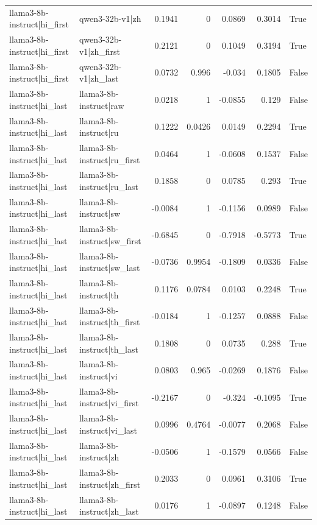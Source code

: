 \begin{table}
\begin{tabular}{l l r r r r l}
llama3-8b-instruct|hi_first & qwen3-32b-v1|zh & 0.1941 & 0 & 0.0869 & 0.3014 & True \\
llama3-8b-instruct|hi_first & qwen3-32b-v1|zh_first & 0.2121 & 0 & 0.1049 & 0.3194 & True \\
llama3-8b-instruct|hi_first & qwen3-32b-v1|zh_last & 0.0732 & 0.996 & -0.034 & 0.1805 & False \\
llama3-8b-instruct|hi_last & llama3-8b-instruct|raw & 0.0218 & 1 & -0.0855 & 0.129 & False \\
llama3-8b-instruct|hi_last & llama3-8b-instruct|ru & 0.1222 & 0.0426 & 0.0149 & 0.2294 & True \\
llama3-8b-instruct|hi_last & llama3-8b-instruct|ru_first & 0.0464 & 1 & -0.0608 & 0.1537 & False \\
llama3-8b-instruct|hi_last & llama3-8b-instruct|ru_last & 0.1858 & 0 & 0.0785 & 0.293 & True \\
llama3-8b-instruct|hi_last & llama3-8b-instruct|sw & -0.0084 & 1 & -0.1156 & 0.0989 & False \\
llama3-8b-instruct|hi_last & llama3-8b-instruct|sw_first & -0.6845 & 0 & -0.7918 & -0.5773 & True \\
llama3-8b-instruct|hi_last & llama3-8b-instruct|sw_last & -0.0736 & 0.9954 & -0.1809 & 0.0336 & False \\
llama3-8b-instruct|hi_last & llama3-8b-instruct|th & 0.1176 & 0.0784 & 0.0103 & 0.2248 & True \\
llama3-8b-instruct|hi_last & llama3-8b-instruct|th_first & -0.0184 & 1 & -0.1257 & 0.0888 & False \\
llama3-8b-instruct|hi_last & llama3-8b-instruct|th_last & 0.1808 & 0 & 0.0735 & 0.288 & True \\
llama3-8b-instruct|hi_last & llama3-8b-instruct|vi & 0.0803 & 0.965 & -0.0269 & 0.1876 & False \\
llama3-8b-instruct|hi_last & llama3-8b-instruct|vi_first & -0.2167 & 0 & -0.324 & -0.1095 & True \\
llama3-8b-instruct|hi_last & llama3-8b-instruct|vi_last & 0.0996 & 0.4764 & -0.0077 & 0.2068 & False \\
llama3-8b-instruct|hi_last & llama3-8b-instruct|zh & -0.0506 & 1 & -0.1579 & 0.0566 & False \\
llama3-8b-instruct|hi_last & llama3-8b-instruct|zh_first & 0.2033 & 0 & 0.0961 & 0.3106 & True \\
llama3-8b-instruct|hi_last & llama3-8b-instruct|zh_last & 0.0176 & 1 & -0.0897 & 0.1248 & False \\

\end{tabular}
\end{table}
